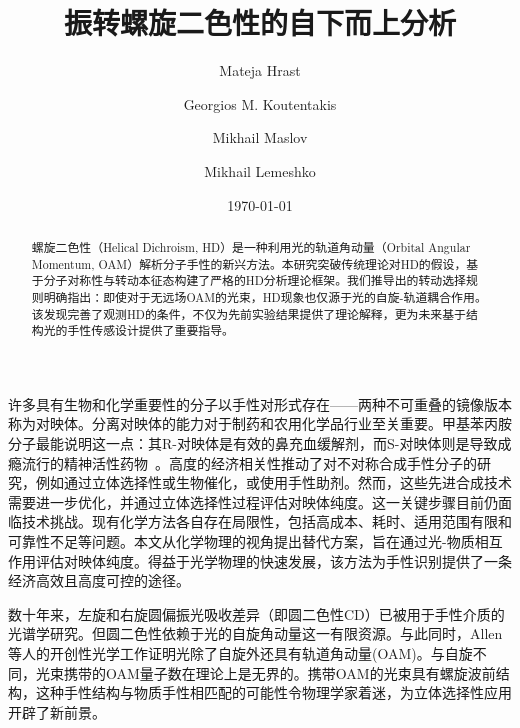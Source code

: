 \documentclass[reprint,aps,prl,twocolumn,superscriptaddress,groupedaddress]{revtex4-2}
\begin{document}
\begin{CJK*}{UTF8}{gbsn}
\title{振转螺旋二色性的自下而上分析}
\author{Mateja Hrast}
\author{Georgios M. Koutentakis}
\author{Mikhail Maslov}
\author{Mikhail Lemeshko}
\date{\today}
\begin{abstract}
螺旋二色性（Helical Dichroism, HD）是一种利用光的轨道角动量（Orbital Angular Momentum, OAM）解析分子手性的新兴方法。本研究突破传统理论对HD的假设，基于分子对称性与转动本征态构建了严格的HD分析理论框架。我们推导出的转动选择规则明确指出：即使对于无远场OAM的光束，HD现象也仅源于光的自旋-轨道耦合作用。该发现完善了观测HD的条件，不仅为先前实验结果提供了理论解释，更为未来基于结构光的手性传感设计提供了重要指导。
\end{abstract}
\maketitle
许多具有生物和化学重要性的分子以手性对形式存在——两种不可重叠的镜像版本称为对映体。分离对映体的能力对于制药和农用化学品行业至关重要\cite{MAIER2001}。甲基苯丙胺分子最能说明这一点：其R-对映体是有效的鼻充血缓解剂，而S-对映体则是导致成瘾流行的精神活性药物~\cite{barkholtz2023}。高度的经济相关性推动了对不对称合成手性分子的研究，例如通过立体选择性或生物催化，或使用手性助剂\cite{Brown1989}。然而，这些先进合成技术需要进一步优化，并通过立体选择性过程评估对映体纯度。这一关键步骤目前仍面临技术挑战。现有化学方法各自存在局限性，包括高成本、耗时、适用范围有限和可靠性不足等问题\cite{qian2023}。本文从化学物理的视角提出替代方案，旨在通过光-物质相互作用评估对映体纯度。得益于光学物理的快速发展\cite{Koch2019}，该方法为手性识别提供了一条经济高效且高度可控的途径。

数十年来，左旋和右旋圆偏振光吸收差异（即圆二色性CD）\cite{deutsche1970,Holzwarth1974}已被用于手性介质的光谱学研究\cite{Miles2021}。但圆二色性依赖于光的自旋角动量这一有限资源。与此同时，Allen等人的开创性光学工作\cite{Allen1992}证明光除了自旋外还具有轨道角动量(OAM)。与自旋不同，光束携带的OAM量子数在理论上是无界的。携带OAM的光束具有螺旋波前结构，这种手性结构与物质手性相匹配的可能性令物理学家着迷，为立体选择性应用开辟了新前景。


\end{CJK*}
\end{document}
